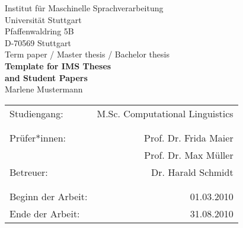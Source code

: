 \documentclass[12pt,leqno,a4paper]{article}
\newcommand{\Titel}{Template for IMS Theses\\ and Student Papers}
\begin{document}

\begin{titlepage}
  \large
   \begin{center}
    Institut für Maschinelle Sprachverarbeitung\\
    Universität Stuttgart\\
    Pfaffenwaldring 5B\\
    D-70569 Stuttgart\\    
    
    \vspace{2.5cm}
    Term paper / Master thesis / Bachelor thesis \\
    {\LARGE \bf \Titel} \\
    \vspace{2cm}
    Marlene Mustermann\\
       \vfill
    \begin{tabular}[t]{lr}
    Studiengang: & M.Sc. Computational Linguistics \\ %
    \\
    \\
    {Prüfer*innen:} & Prof. Dr. Frida Maier\\
     & Prof. Dr. Max Müller\\
    {Betreuer:} & Dr. Harald Schmidt\\ 
    \\
    \\
    {Beginn der Arbeit:} & 01.03.2010\\
    {Ende der Arbeit:} & 31.08.2010\\
    \end{tabular}
  \end{center}
\setlength{\hoffset}{0cm}

  \normalsize
\end{titlepage}


\newpage
\thispagestyle{empty}
\end{document}
